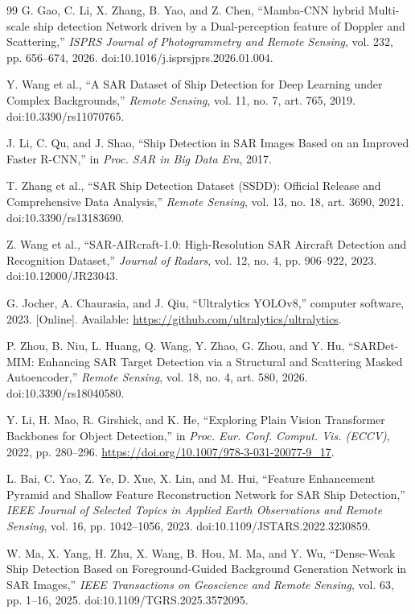 \documentclass[journal]{IEEEtran}
\begin{document}
\begin{thebibliography}{99}
G. Gao, C. Li, X. Zhang, B. Yao, and Z. Chen, ``Mamba-CNN hybrid Multi-scale ship detection Network driven by a Dual-perception feature of Doppler and Scattering,'' \emph{ISPRS Journal of Photogrammetry and Remote Sensing}, vol. 232, pp. 656--674, 2026. doi:10.1016/j.isprsjprs.2026.01.004.

Y. Wang et al., ``A SAR Dataset of Ship Detection for Deep Learning under Complex Backgrounds,'' \emph{Remote Sensing}, vol. 11, no. 7, art. 765, 2019. doi:10.3390/rs11070765.

J. Li, C. Qu, and J. Shao, ``Ship Detection in SAR Images Based on an Improved Faster R-CNN,'' in \emph{Proc. SAR in Big Data Era}, 2017.

T. Zhang et al., ``SAR Ship Detection Dataset (SSDD): Official Release and Comprehensive Data Analysis,'' \emph{Remote Sensing}, vol. 13, no. 18, art. 3690, 2021. doi:10.3390/rs13183690.

Z. Wang et al., ``SAR-AIRcraft-1.0: High-Resolution SAR Aircraft Detection and Recognition Dataset,'' \emph{Journal of Radars}, vol. 12, no. 4, pp. 906--922, 2023. doi:10.12000/JR23043.

G. Jocher, A. Chaurasia, and J. Qiu,
``Ultralytics YOLOv8,'' computer software, 2023.
[Online]. Available: \url{https://github.com/ultralytics/ultralytics}.

P. Zhou, B. Niu, L. Huang, Q. Wang, Y. Zhao, G. Zhou, and Y. Hu, ``SARDet-MIM: Enhancing SAR Target Detection via a Structural and Scattering Masked Autoencoder,'' \emph{Remote Sensing}, vol. 18, no. 4, art. 580, 2026. doi:10.3390/rs18040580.

Y. Li, H. Mao, R. Girshick, and K. He,
``Exploring Plain Vision Transformer Backbones for Object Detection,''
in \emph{Proc. Eur. Conf. Comput. Vis. (ECCV)},
2022, pp. 280--296. \url{https://doi.org/10.1007/978-3-031-20077-9_17}.

L. Bai, C. Yao, Z. Ye, D. Xue, X. Lin, and M. Hui,
``Feature Enhancement Pyramid and Shallow Feature Reconstruction Network for SAR Ship Detection,''
\emph{IEEE Journal of Selected Topics in Applied Earth Observations and Remote Sensing},
vol. 16, pp. 1042--1056, 2023. doi:10.1109/JSTARS.2022.3230859.

W. Ma, X. Yang, H. Zhu, X. Wang, B. Hou, M. Ma, and Y. Wu,
``Dense-Weak Ship Detection Based on Foreground-Guided Background Generation Network in SAR Images,''
\emph{IEEE Transactions on Geoscience and Remote Sensing},
vol. 63, pp. 1--16, 2025. doi:10.1109/TGRS.2025.3572095.


\end{thebibliography}
\end{document}

